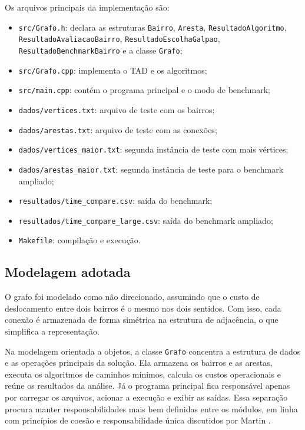 \documentclass[12pt,a4paper]{article}
\begin{document}
Os arquivos principais da implementação são:

\begin{itemize}[noitemsep]
    \item \texttt{src/Grafo.h}: declara as estruturas \texttt{Bairro},
          \texttt{Aresta}, \texttt{ResultadoAlgoritmo},
          \texttt{ResultadoAvaliacaoBairro},
          \texttt{ResultadoEscolhaGalpao},
          \texttt{ResultadoBenchmarkBairro} e a classe \texttt{Grafo};
    \item \texttt{src/Grafo.cpp}: implementa o TAD e os algoritmos;
    \item \texttt{src/main.cpp}: contém o programa principal e o modo de benchmark;
    \item \texttt{dados/vertices.txt}: arquivo de teste com os bairros;
    \item \texttt{dados/arestas.txt}: arquivo de teste com as conexões;
    \item \texttt{dados/vertices\_maior.txt}: segunda instância de teste com
          mais vértices;
    \item \texttt{dados/arestas\_maior.txt}: segunda instância de teste para o
          benchmark ampliado;
    \item \texttt{resultados/time\_compare.csv}: saída do benchmark;
    \item \texttt{resultados/time\_compare\_large.csv}: saída do benchmark ampliado;
    \item \texttt{Makefile}: compilação e execução.
\end{itemize}

\subsection{Modelagem adotada}

O grafo foi modelado como não direcionado, assumindo que o custo de
deslocamento entre dois bairros é o mesmo nos dois sentidos. Com isso, cada
conexão é armazenada de forma simétrica na estrutura de adjacência, o que
simplifica a representação.

Na modelagem orientada a objetos, a classe \texttt{Grafo} concentra a estrutura
de dados e as operações principais da solução. Ela armazena os bairros e as
arestas, executa os algoritmos de caminhos mínimos, calcula os custos
operacionais e reúne os resultados da análise. Já o programa principal fica
responsável apenas por carregar os arquivos, acionar a execução e exibir as
saídas. Essa separação procura manter responsabilidades mais bem definidas
entre os módulos, em linha com princípios de coesão e responsabilidade única
discutidos por Martin \cite{martin2009,martin2018}.
\end{document}
